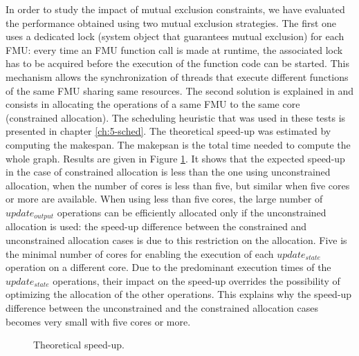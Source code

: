 In order to study the impact of mutual exclusion constraints, we have evaluated the performance obtained using two mutual exclusion strategies. The first one uses a dedicated lock (system object that guarantees mutual exclusion) for each FMU: every time an FMU function call is made at runtime, the associated lock has to be acquired before the execution of the function code can be started. This mechanism allows the synchronization of threads that execute different functions of the same FMU sharing same resources. The second solution is explained in \cite{benkhaled:2014} and consists in allocating the operations of a same FMU to the same core (constrained allocation). The scheduling heuristic that was used in these tests is presented in chapter \ref{ch:5-sched}. The theoretical speed-up was estimated by computing the makespan. The makepsan is the total time needed to compute the whole graph. Results are given in Figure \ref{fig:theoretical-speedup}. It shows that the expected speed-up in the case of constrained allocation is less than the one using unconstrained allocation, when the number of cores is less than five, but similar when five cores or more are available. When using less than five cores, the large number of $update_{output}$ operations can be efficiently allocated only if the unconstrained allocation is used: the speed-up difference between the constrained and unconstrained allocation cases is due to this restriction on the allocation. Five is the minimal number of cores for enabling the execution of each $update_{state}$ operation on a different core. Due to the predominant execution times of the $update_{state}$ operations, their impact on the speed-up overrides the possibility of optimizing the allocation of the other operations. This explains why the speed-up difference between the unconstrained and the constrained allocation cases becomes very small with five cores or more.

\begin{figure}[phbt]
\centering

\caption{Theoretical speed-up.}
\label{fig:theoretical-speedup}
\end{figure}

